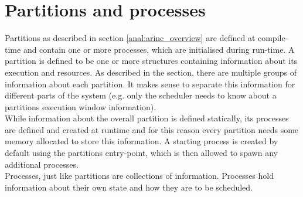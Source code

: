 \section{Partitions and processes}
\label{design:part_proc}
Partitions as described in section \ref{anal:arinc_overview} are defined at compile-time and
contain one or more processes, which are initialised during run-time.
A partition is defined to be one or more structures containing information about
its execution and resources.
As described in the  section, there are multiple
groups of information about each partition. It makes sense to separate this information for
different parts of the system (e.g. only the scheduler needs to know about a
partitions\textquotesingle{} execution window information).\\

While information about the overall partition is defined statically, its
processes are defined and created at runtime and for this reason every partition needs
some memory allocated to store this information. A starting process is created
by default using the partitions\textquotesingle{} entry-point, which is then allowed to
spawn any additional processes.\\

Processes, just like partitions are collections of information. Processes hold
information about their own state and how they are to be scheduled.

%
%
%
%
